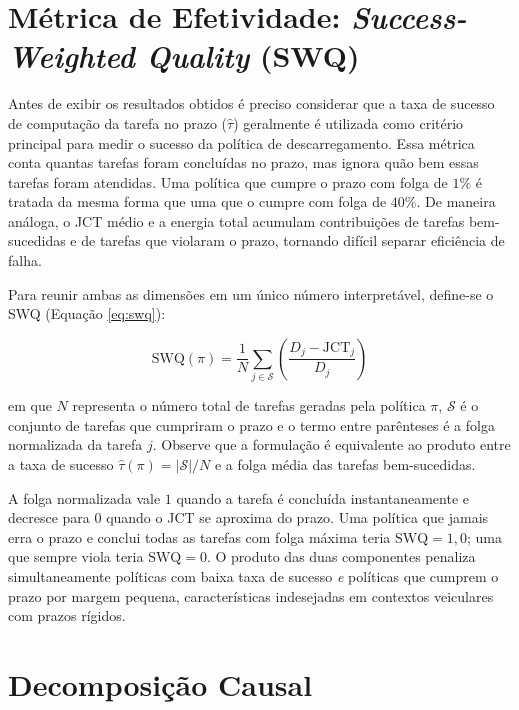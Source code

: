 \section*{Métrica de Efetividade: \textit{Success-Weighted Quality} (SWQ)}

Antes de exibir os resultados obtidos é preciso considerar que a taxa de sucesso de computação da tarefa no prazo ($\hat{\tau}$) geralmente é utilizada como critério principal para medir o sucesso da política de descarregamento. Essa métrica conta quantas tarefas foram concluídas no prazo, mas ignora quão bem essas tarefas foram atendidas. Uma política que cumpre o prazo com folga de $1\%$ é tratada da mesma forma que uma que o cumpre com folga de $40\%$. De maneira análoga, o \gls{JCT} médio e a energia total acumulam contribuições de tarefas bem-sucedidas e de tarefas que violaram o prazo, tornando difícil separar eficiência de falha.

Para reunir ambas as dimensões em um único número interpretável, define-se o \gls{SWQ} (Equação \ref{eq:swq}):

\begin{equation}
    \mathrm{SWQ}(\pi) = \frac{1}{N} \sum_{j \in \mathcal{S}} \left( \frac{D_j - \mathrm{JCT}_j}{D_j} \right)
    \label{eq:swq}
\end{equation}

\noindent em que $N$ representa o número total de tarefas geradas pela política $\pi$, $\mathcal{S}$ é o conjunto de tarefas que cumpriram o prazo e o termo entre parênteses é a folga normalizada da tarefa $j$. Observe que a formulação é equivalente ao produto entre a taxa de sucesso $\hat{\tau}(\pi) = |\mathcal{S}|/N$ e a folga média das tarefas bem-sucedidas.

A folga normalizada vale $1$ quando a tarefa é concluída instantaneamente e decresce para $0$ quando o \gls{JCT} se aproxima do prazo. Uma política que jamais erra o prazo e conclui todas as tarefas com folga máxima teria $\mathrm{SWQ} = 1{,}0$; uma que sempre viola teria $\mathrm{SWQ} = 0$. O produto das duas componentes penaliza simultaneamente políticas com baixa taxa de sucesso \emph{e} políticas que cumprem o prazo por margem pequena, características indesejadas em contextos veiculares com prazos rígidos.


\section*{Decomposição Causal}


